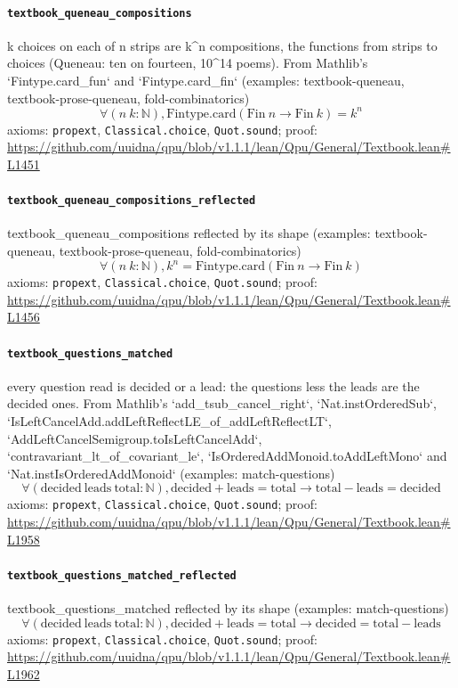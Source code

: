 \documentclass[11pt]{article}
\begin{document}
\paragraph{\texttt{textbook\_queneau\_compositions}}
k choices on each of n strips are k\^{}n compositions, the functions from strips to choices (Queneau: ten on fourteen, 10\^{}14 poems). From Mathlib's `Fintype.card\_fun` and `Fintype.card\_fin` (examples: textbook-queneau, textbook-prose-queneau, fold-combinatorics)
\[ \forall (n\ k : \mathbb{N}), \mathrm{Fintype.card} (\mathrm{Fin}\ n \to \mathrm{Fin}\ k) = k ^{n} \]
\noindent axioms: \texttt{propext}, \texttt{Classical.choice}, \texttt{Quot.sound}; proof: \url{https://github.com/uuidna/qpu/blob/v1.1.1/lean/Qpu/General/Textbook.lean\#L1451}

\paragraph{\texttt{textbook\_queneau\_compositions\_reflected}}
textbook\_queneau\_compositions reflected by its shape (examples: textbook-queneau, textbook-prose-queneau, fold-combinatorics)
\[ \forall (n\ k : \mathbb{N}), k ^{n} = \mathrm{Fintype.card} (\mathrm{Fin}\ n \to \mathrm{Fin}\ k) \]
\noindent axioms: \texttt{propext}, \texttt{Classical.choice}, \texttt{Quot.sound}; proof: \url{https://github.com/uuidna/qpu/blob/v1.1.1/lean/Qpu/General/Textbook.lean\#L1456}

\paragraph{\texttt{textbook\_questions\_matched}}
every question read is decided or a lead: the questions less the leads are the decided ones. From Mathlib's `add\_tsub\_cancel\_right`, `Nat.instOrderedSub`, `IsLeftCancelAdd.addLeftReflectLE\_of\_addLeftReflectLT`, `AddLeftCancelSemigroup.toIsLeftCancelAdd`, `contravariant\_lt\_of\_covariant\_le`, `IsOrderedAddMonoid.toAddLeftMono` and `Nat.instIsOrderedAddMonoid` (examples: match-questions)
\[ \forall (\mathrm{decided}\ \mathrm{leads}\ \mathrm{total} : \mathbb{N}), \mathrm{decided} + \mathrm{leads} = \mathrm{total} \to \mathrm{total} - \mathrm{leads} = \mathrm{decided} \]
\noindent axioms: \texttt{propext}, \texttt{Classical.choice}, \texttt{Quot.sound}; proof: \url{https://github.com/uuidna/qpu/blob/v1.1.1/lean/Qpu/General/Textbook.lean\#L1958}

\paragraph{\texttt{textbook\_questions\_matched\_reflected}}
textbook\_questions\_matched reflected by its shape (examples: match-questions)
\[ \forall (\mathrm{decided}\ \mathrm{leads}\ \mathrm{total} : \mathbb{N}), \mathrm{decided} + \mathrm{leads} = \mathrm{total} \to \mathrm{decided} = \mathrm{total} - \mathrm{leads} \]
\noindent axioms: \texttt{propext}, \texttt{Classical.choice}, \texttt{Quot.sound}; proof: \url{https://github.com/uuidna/qpu/blob/v1.1.1/lean/Qpu/General/Textbook.lean\#L1962}
\end{document}
